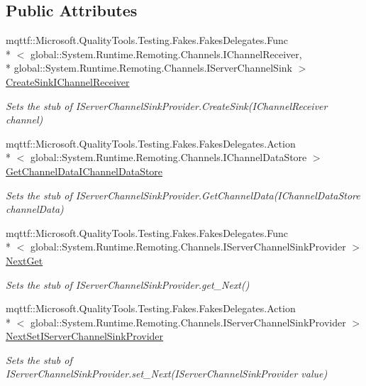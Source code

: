\subsection*{Public Attributes}
\begin{DoxyCompactItemize}
\item 
mqttf\-::\-Microsoft.\-Quality\-Tools.\-Testing.\-Fakes.\-Fakes\-Delegates.\-Func\\*
$<$ global\-::\-System.\-Runtime.\-Remoting.\-Channels.\-I\-Channel\-Receiver, \\*
global\-::\-System.\-Runtime.\-Remoting.\-Channels.\-I\-Server\-Channel\-Sink $>$ \hyperlink{class_system_1_1_runtime_1_1_remoting_1_1_channels_1_1_fakes_1_1_stub_i_server_formatter_sink_provider_ad92ef6ee03f59349cb2236f17ba65ec9}{Create\-Sink\-I\-Channel\-Receiver}
\begin{DoxyCompactList}\small\item\em Sets the stub of I\-Server\-Channel\-Sink\-Provider.\-Create\-Sink(\-I\-Channel\-Receiver channel)\end{DoxyCompactList}\item 
mqttf\-::\-Microsoft.\-Quality\-Tools.\-Testing.\-Fakes.\-Fakes\-Delegates.\-Action\\*
$<$ global\-::\-System.\-Runtime.\-Remoting.\-Channels.\-I\-Channel\-Data\-Store $>$ \hyperlink{class_system_1_1_runtime_1_1_remoting_1_1_channels_1_1_fakes_1_1_stub_i_server_formatter_sink_provider_a19d81bbf00aab628cb20cdb0e9ee1770}{Get\-Channel\-Data\-I\-Channel\-Data\-Store}
\begin{DoxyCompactList}\small\item\em Sets the stub of I\-Server\-Channel\-Sink\-Provider.\-Get\-Channel\-Data(\-I\-Channel\-Data\-Store channel\-Data)\end{DoxyCompactList}\item 
mqttf\-::\-Microsoft.\-Quality\-Tools.\-Testing.\-Fakes.\-Fakes\-Delegates.\-Func\\*
$<$ global\-::\-System.\-Runtime.\-Remoting.\-Channels.\-I\-Server\-Channel\-Sink\-Provider $>$ \hyperlink{class_system_1_1_runtime_1_1_remoting_1_1_channels_1_1_fakes_1_1_stub_i_server_formatter_sink_provider_a3b562dfa75c109e03b06175f747f274c}{Next\-Get}
\begin{DoxyCompactList}\small\item\em Sets the stub of I\-Server\-Channel\-Sink\-Provider.\-get\-\_\-\-Next()\end{DoxyCompactList}\item 
mqttf\-::\-Microsoft.\-Quality\-Tools.\-Testing.\-Fakes.\-Fakes\-Delegates.\-Action\\*
$<$ global\-::\-System.\-Runtime.\-Remoting.\-Channels.\-I\-Server\-Channel\-Sink\-Provider $>$ \hyperlink{class_system_1_1_runtime_1_1_remoting_1_1_channels_1_1_fakes_1_1_stub_i_server_formatter_sink_provider_ac961f1bf936af25ab8a6a9783ae8020d}{Next\-Set\-I\-Server\-Channel\-Sink\-Provider}
\begin{DoxyCompactList}\small\item\em Sets the stub of I\-Server\-Channel\-Sink\-Provider.\-set\-\_\-\-Next(\-I\-Server\-Channel\-Sink\-Provider value)\end{DoxyCompactList}\end{DoxyCompactItemize}


